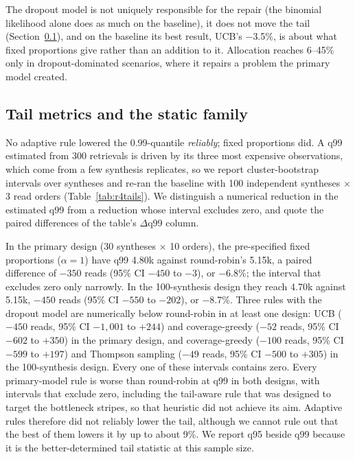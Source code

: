 \documentclass[acmsmall,screen]{acmart}
\begin{document}
The dropout model is not uniquely responsible for the repair (the binomial likelihood alone does as much
on the baseline), it does not move the tail (Section~\ref{sec:res-tail}), and on the baseline its best
result, UCB's $-$3.5\%, is about what fixed proportions give rather than an addition to it.  Allocation
reaches 6--45\% only in dropout-dominated scenarios, where it repairs a problem the primary model created.

\subsection{Tail metrics and the static family}\label{sec:res-tail}

No adaptive rule lowered the 0.99-quantile \emph{reliably}; fixed proportions did.  A q99 estimated from
300 retrievals is driven by its three most expensive observations, which come from a few synthesis
replicates, so we report cluster-bootstrap intervals over syntheses and re-ran the baseline with 100
independent syntheses $\times$ 3 read orders (Table~\ref{tab:r4tails}).  We distinguish a numerical
reduction in the estimated q99 from a reduction whose interval excludes zero, and quote the paired
differences of the table's $\Delta$q99 column.

In the primary design (30 syntheses $\times$ 10 orders), the pre-specified fixed proportions
($\alpha{=}1$) have q99 4.80k against round-robin's 5.15k, a paired difference of $-350$ reads (95\% CI $-450$ to $-3$),
or $-$6.8\%; the interval that excludes zero only narrowly.  In the 100-synthesis design they
reach 4.70k against 5.15k, $-450$ reads (95\% CI $-550$ to $-202$), or $-$8.7\%.  Three rules with the dropout model
are numerically below round-robin in at least one design: UCB ($-450$ reads, 95\% CI $-1{,}001$ to $+244$) and coverage-greedy
($-52$ reads, 95\% CI $-602$ to $+350$) in the primary design, and coverage-greedy ($-100$ reads, 95\% CI $-599$ to $+197$) and Thompson sampling
($-49$ reads, 95\% CI $-500$ to $+305$) in the 100-synthesis design.  Every one of these intervals contains zero.  Every
primary-model rule is worse than round-robin at q99 in both designs, with intervals that exclude zero,
including the tail-aware rule that was designed to target the bottleneck stripes, so that heuristic did
not achieve its aim.  Adaptive rules therefore did not reliably lower the tail, although we cannot rule
out that the best of them lowers it by up to about 9\%.  We report q95 beside q99 because it is the
better-determined tail statistic at this sample size.
\end{document}
